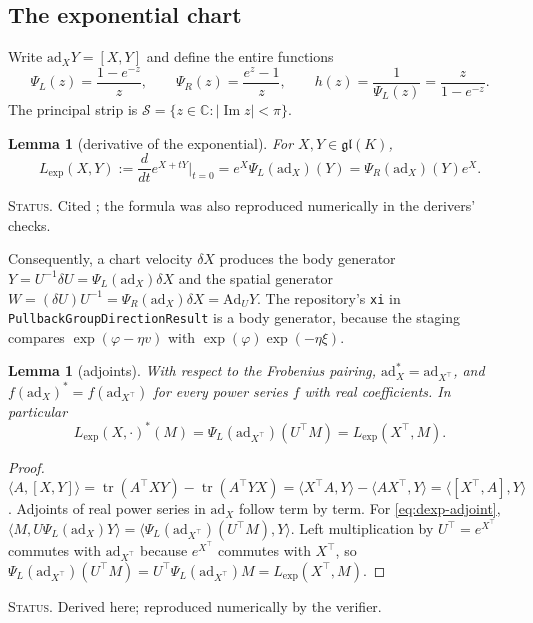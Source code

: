 \documentclass[11pt]{article}
\newtheorem{lemma}[theorem]{Lemma}
\theoremstyle{definition}
\theoremstyle{remark}
\newcommand{\C}{\mathbb{C}}
\newcommand{\gl}{\mathfrak{gl}}
\newcommand{\ad}{\mathrm{ad}}
\newcommand{\Ad}{\mathrm{Ad}}
\newcommand{\tr}{\operatorname{tr}}
\newcommand{\Imag}{\operatorname{Im}}
\newcommand{\ip}[2]{\langle #1, #2\rangle}
\newcommand{\status}[1]{\par\smallskip\noindent\textsc{Status.} #1\par\smallskip}
\begin{document}
\subsection{The exponential chart}

Write $\ad_XY=[X,Y]$ and define the entire functions
\begin{equation}\label{eq:psi}
\Psi_L(z)=\frac{1-e^{-z}}{z},\qquad \Psi_R(z)=\frac{e^{z}-1}{z},\qquad h(z)=\frac{1}{\Psi_L(z)}=\frac{z}{1-e^{-z}}.
\end{equation}
The principal strip is $\mathcal{S}=\{z\in\C:|\Imag z|<\pi\}$.

\begin{lemma}[derivative of the exponential]\label{lem:dexp}
For $X,Y\in\gl(K)$,
\begin{equation}\label{eq:dexp}
L_{\exp}(X,Y):=\frac{d}{dt}e^{X+tY}\Big|_{t=0}=e^X\Psi_L(\ad_X)(Y)=\Psi_R(\ad_X)(Y)e^X.
\end{equation}
\end{lemma}
\status{Cited \cite[Ch.~5]{Hall2015}; the formula was also reproduced numerically in the derivers' checks.}

Consequently, a chart velocity $\delta X$ produces the body generator $Y=U^{-1}\delta U=\Psi_L(\ad_X)\delta X$ and the spatial generator $W=(\delta U)U^{-1}=\Psi_R(\ad_X)\delta X=\Ad_UY$. The repository's \texttt{xi} in \texttt{PullbackGroupDirectionResult} is a body generator, because the staging compares $\exp(\varphi-\eta v)$ with $\exp(\varphi)\exp(-\eta\xi)$.

\begin{lemma}[adjoints]\label{lem:adjoint}
With respect to the Frobenius pairing, $\ad_X^*=\ad_{X^\top}$, and $f(\ad_X)^*=f(\ad_{X^\top})$ for every power series $f$ with real coefficients. In particular
\begin{equation}\label{eq:dexp-adjoint}
L_{\exp}(X,\cdot)^*(M)=\Psi_L(\ad_{X^\top})(U^\top M)=L_{\exp}(X^\top,M).
\end{equation}
\end{lemma}
\begin{proof}
$\ip{A}{[X,Y]}=\tr(A^\top XY)-\tr(A^\top YX)=\ip{X^\top A}{Y}-\ip{AX^\top}{Y}=\ip{[X^\top,A]}{Y}$. Adjoints of real power series in $\ad_X$ follow term by term. For \eqref{eq:dexp-adjoint}, $\ip{M}{U\Psi_L(\ad_X)Y}=\ip{\Psi_L(\ad_{X^\top})(U^\top M)}{Y}$. Left multiplication by $U^\top=e^{X^\top}$ commutes with $\ad_{X^\top}$ because $e^{X^\top}$ commutes with $X^\top$, so $\Psi_L(\ad_{X^\top})(U^\top M)=U^\top\Psi_L(\ad_{X^\top})M=L_{\exp}(X^\top,M)$.
\end{proof}
\status{Derived here; reproduced numerically by the verifier.}
\end{document}
